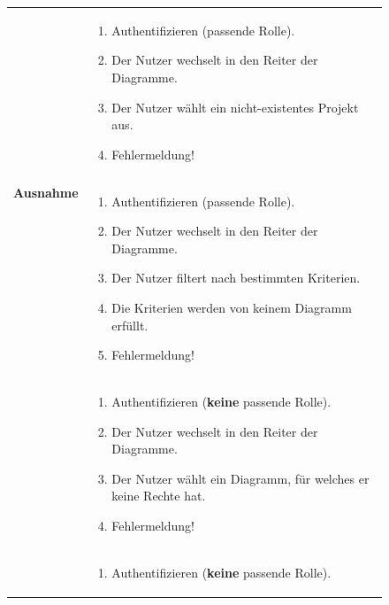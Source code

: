 \begin{figure}[h]
	\centering
	\begin{tabularx}{\textwidth}{ X | X }		
		\multirow{2}{*}{\textbf{Ausnahme}} &
		\begin{enumerate} %
			\item Authentifizieren (passende Rolle).
			\item Der Nutzer wechselt in den Reiter der Diagramme.
			\item Der Nutzer wählt ein nicht-existentes Projekt aus.
			\item Fehlermeldung!
		\end{enumerate} \\\cline{2-2} &
		\begin{enumerate} %
			\item Authentifizieren (passende Rolle).
			\item Der Nutzer wechselt in den Reiter der Diagramme.
			\item Der Nutzer filtert nach bestimmten Kriterien.
			\item Die Kriterien werden von keinem Diagramm erfüllt.
			\item Fehlermeldung!
		\end{enumerate}  \\\cline{2-2} &
		\begin{enumerate} %
			\item Authentifizieren (\textbf{keine} passende Rolle).
			\item Der Nutzer wechselt in den Reiter der Diagramme.
			\item Der Nutzer wählt ein Diagramm, für welches er keine Rechte hat.
			\item Fehlermeldung!
		\end{enumerate}  \\\cline{2-2} &
		\begin{enumerate} %
			\item Authentifizieren (\textbf{keine} passende Rolle).

\end{enumerate}
\end{tabularx}
\end{figure}
